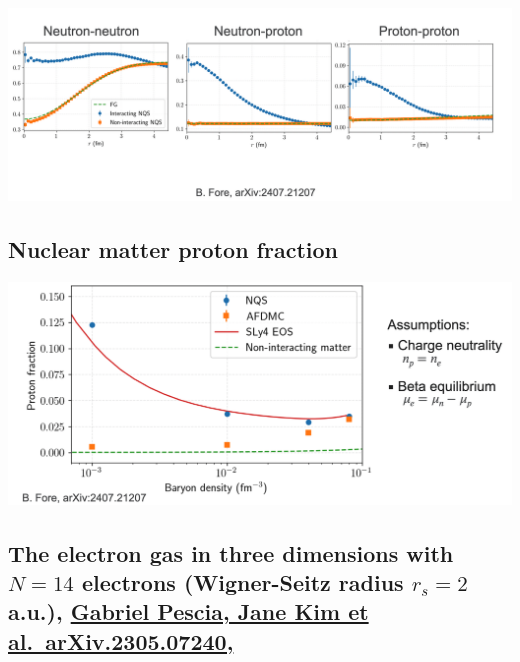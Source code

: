 \documentclass[%
oneside,                 %
final,                   %
10pt]{article}
\begin{document}
\vspace{6mm}

\centerline{\includegraphics[width=1.0\linewidth]{figures/mbpfig8.png}}

\vspace{6mm}

\subsection{Nuclear matter proton fraction}

\vspace{6mm}

\centerline{\includegraphics[width=1.0\linewidth]{figures/mbpfig9.png}}

\vspace{6mm}

\subsection{The electron gas in three dimensions with $N=14$ electrons (Wigner-Seitz radius $r_s=2$ a.u.), \href{{https://doi.org/10.48550/arXiv.2305.07240}}{Gabriel Pescia, Jane Kim et al.~arXiv.2305.07240,}}
\end{document}
